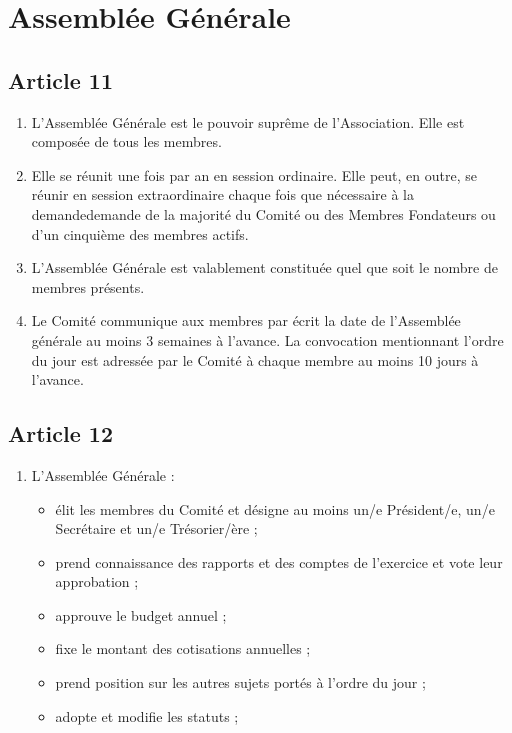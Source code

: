 \documentclass[12pt,twoside]{report}
\begin{document}
\section*{Assemblée Générale}

\subsection*{Article 11}
\begin{enumerate}
\item L’Assemblée Générale est le pouvoir suprême de l’Association. Elle est composée de tous les membres.

\item Elle se réunit une fois par an en session ordinaire. Elle peut, en outre, se réunir en session extraordinaire chaque fois que nécessaire à la demandedemande de la majorité du Comité ou des Membres Fondateurs ou d’un cinquième des membres actifs.

\item L’Assemblée Générale est valablement constituée quel que soit le nombre de membres présents.

\item Le Comité communique aux membres par écrit la date de l'Assemblée générale au moins 3 semaines à l'avance. La convocation mentionnant l'ordre du jour est adressée par le Comité à chaque membre au moins 10 jours à l'avance.
\end{enumerate}

\subsection*{Article 12}
\begin{enumerate}
\item L’Assemblée Générale :
\begin{itemize}
\item élit les membres du Comité et désigne au moins un/e Président/e, un/e Secrétaire et un/e Trésorier/ère ;
\item prend connaissance des rapports et des comptes de l’exercice et vote leur approbation ;
\item approuve le budget annuel ;
\item fixe le montant des cotisations annuelles ;
\item prend position sur les autres sujets portés à l’ordre du jour ;
\item adopte et modifie les statuts ;
\end{itemize}
\end{enumerate}
\end{document}
